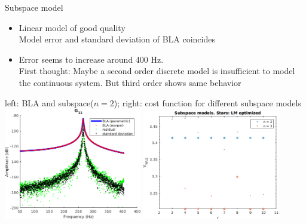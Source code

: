 \documentclass[9pt]{beamer}
\begin{document}


\begin{frame}{Subspace model}
  \begin{itemize}
  \item Linear model of good quality\\
    Model error and standard deviation of BLA coincides
  \item Error seems to increase around 400 Hz.\\
    First thought: Maybe a second order discrete model is insufficient to model
    the continuous system. But third order shows same behavior
  \end{itemize}
  \begin{center}
    left: BLA and subspace($n=2$); right: cost function for different subspace
    models
    \includegraphics[width=0.45\textwidth]{fig/b1_A10_ms_full_subspace_n2}
    \includegraphics[width=0.45\textwidth]{fig/b1_A10_ms_full_sub_cost}
  \end{center}
\end{frame}
\end{document}
